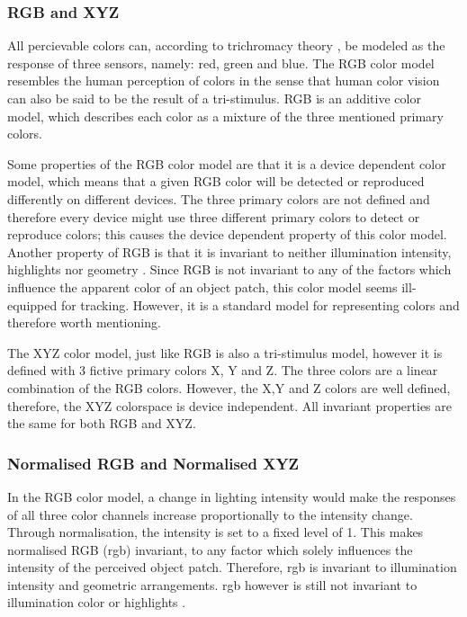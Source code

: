 \documentclass[a4paper,11pt]{article}
\begin{document}
\subsubsection{RGB and XYZ}

All percievable colors can, according to trichromacy theory \cite{gevers_color}, be modeled as the response of three sensors, namely: red, green and blue. The RGB color model resembles the human perception of colors in the sense that human color vision can also be said to be the result of a tri-stimulus.  RGB is an additive color model, which describes each color as a mixture of the three mentioned primary colors.

Some properties of the RGB color model are that it is a device dependent color model, which means that a given RGB color will be detected or reproduced differently on different devices. The three primary colors are not defined and therefore every device might use three different primary colors to detect or reproduce colors; this causes the device dependent property of this color model. Another property of RGB is that it is invariant to neither illumination intensity, highlights nor geometry \cite{gevers_invariant}. Since RGB is not invariant to any of the factors which influence the apparent color of an object patch, this color model seems ill-equipped for tracking. However, it is a standard model for representing colors and therefore worth mentioning.

The XYZ color model, just like RGB is also a tri-stimulus model, however it is defined  with 3 fictive primary colors X, Y and Z. The three colors are a linear combination of the RGB colors. However, the X,Y and Z colors are well defined, therefore, the XYZ colorspace is device independent. All invariant properties are the same for both RGB and XYZ.

\subsubsection{Normalised RGB and Normalised XYZ}

In the RGB color model, a change in lighting intensity would make the responses of all three color channels increase proportionally to the intensity change. Through normalisation, the intensity is set to a fixed level of 1. This makes normalised RGB (rgb) invariant, to any factor which solely influences the intensity of the perceived object patch. Therefore, rgb is invariant to illumination intensity and geometric arrangements. rgb however is still not invariant to illumination color or highlights \cite{gevers_invariant}. 
\end{document}
